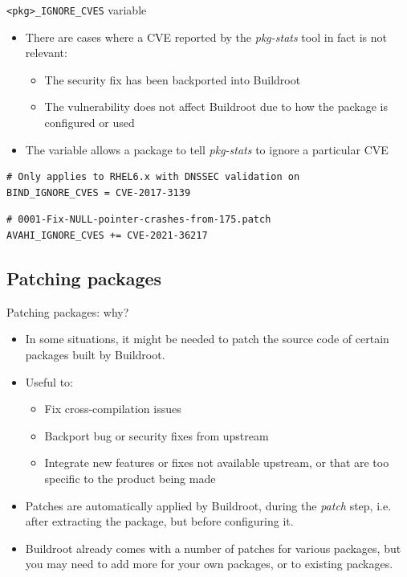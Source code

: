\begin{frame}[fragile]{{\tt <pkg>\_IGNORE\_CVES} variable}

  \begin{itemize}
  \item There are cases where a CVE reported by the {\em pkg-stats}
    tool in fact is not relevant:
    \begin{itemize}
    \item The security fix has been backported into Buildroot
    \item The vulnerability does not affect Buildroot due to how the
      package is configured or used
    \end{itemize}
  \item The  variable allows a package to tell
    {\em pkg-stats} to ignore a particular CVE
  \end{itemize}

  \begin{block}{}
\begin{verbatim}
# Only applies to RHEL6.x with DNSSEC validation on
BIND_IGNORE_CVES = CVE-2017-3139
\end{verbatim}
  \end{block}

  \begin{block}{}
\begin{verbatim}
# 0001-Fix-NULL-pointer-crashes-from-175.patch
AVAHI_IGNORE_CVES += CVE-2021-36217
\end{verbatim}
  \end{block}

\end{frame}

\subsection{Patching packages}

\begin{frame}{Patching packages: why?}
  \begin{itemize}
  \item In some situations, it might be needed to patch the source
    code of certain packages built by Buildroot.
  \item Useful to:
    \begin{itemize}
    \item Fix cross-compilation issues
    \item Backport bug or security fixes from upstream
    \item Integrate new features or fixes not available upstream, or
      that are too specific to the product being made
    \end{itemize}
  \item Patches are automatically applied by Buildroot, during the
    {\em patch} step, i.e. after extracting the package, but before
    configuring it.
  \item Buildroot already comes with a number of patches for various
    packages, but you may need to add more for your own packages, or
    to existing packages.
  \end{itemize}
\end{frame}

